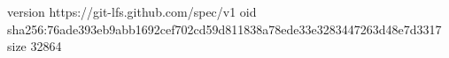 version https://git-lfs.github.com/spec/v1
oid sha256:76ade393eb9abb1692cef702cd59d811838a78ede33e3283447263d48e7d3317
size 32864
